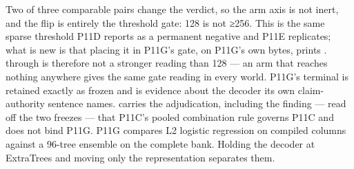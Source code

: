 {}\markdownRendererInterblockSeparator
{}Two of three comparable pairs change the verdict, so the arm axis is not inert, and the flip is entirely the threshold gate: 128 is not ≥256. This is the same sparse threshold P11D reports as a permanent negative and P11E replicates; what is new is that placing it in P11G's gate, on P11G's own bytes, prints .  through  is therefore not a stronger reading than 128 — an arm that reaches nothing anywhere gives the same gate reading in every world.\markdownRendererInterblockSeparator
{}P11G's terminal is retained exactly as frozen and is evidence about the decoder its own claim-authority sentence names.  carries the adjudication, including the finding — read off the two freezes — that P11C's pooled combination rule governs P11C and does not bind P11G.\markdownRendererInterblockSeparator
{}
\markdownRendererSectionEnd \markdownRendererSectionBegin
{}\markdownRendererInterblockSeparator
{}P11G compares L2 logistic regression on  compiled columns against a 96-tree ensemble on the complete bank. Holding the decoder at ExtraTrees and moving only the representation separates them.\markdownRendererInterblockSeparator
{}\markdownRendererInterblockSeparator
